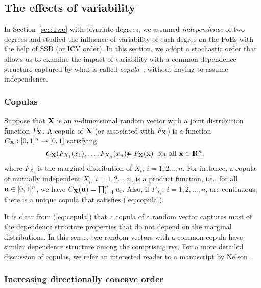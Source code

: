 \documentclass[10pt, journal, compsoc]{IEEEtran}
\newcommand {\bX} {{\bf X}}
\newcommand {\bu} {{\bf u}}
\newcommand {\bx} {{\bf x}}
\newcommand {\R} {{\rm I\kern-2.5pt R}}
\newcommand{\beqa}{\begin{eqnarray}}
\newcommand{\eeqa}{\end{eqnarray}}
\newcommand{\myeq}{& \hspace{-0.1in} = & \hspace{-0.1in}}
\newcommand{\myhb}{\hspace{-0.3in}}
\begin{document}



\subsection{The effects of variability}

In Section~\ref{sec:Two} with bivariate
degrees, we assumed {\em independence} of two 
degrees and studied the influence of 
variability of each degree on the PoEs
with the help of SSD (or ICV order). 
In this section, we adopt a 
stochastic order that allows us to 
examine the impact of variability
with a common dependence structure captured
by what is called {\em copula}~\cite{Copula}, 
without having to assume independence. 

\subsubsection{Copulas}

Suppose that $\bX$ is an $n$-dimensional
random vector with a joint distribution 
function $F_{\bX}$. A copula of $\bX$
(or associated with $F_{\bX}$) is a 
function $C_{\bX}: [0, 1]^n \to [0, 1]$ 
satisfying
\beqa
\myhb C_{\bX}(F_{X_1}(x_1), \ldots, F_{X_n}(x_n))
\myeq F_{\bX}(\bx) \ \mbox{ for all $\bx \in \R^n$},
	\label{eq:copula}
\eeqa
where $F_{X_i}$ is the 
marginal distribution of $X_i$, $i = 1, 2
\ldots, n$. For instance, a copula of
mutually independent $X_i$, $i = 1, 2
\ldots, n$, is a 
product function, i.e., for all 
$\bu \in [0, 1]^n$, we have  
$C_{\bX}(\bu) = \prod_{i=1}^n u_i$. 
Also, if $F_{X_i}$, $i = 1, 2, \ldots, n$,
are continuous, 
there is a unique copula that satisfies
(\ref{eq:copula}). 

It is clear from (\ref{eq:copula}) that 
a copula of a random vector captures most
of the dependence structure properties 
that do not depend on the marginal 
distributions.
In this sense, two random vectors with 
a common copula have similar dependence structure
among the comprising rvs. For a more detailed
discussion of copulas, we refer an 
interested reader to a manuscript
by Nelson~\cite{Copula}.  


\subsubsection{Increasing directionally concave order}
\end{document}
